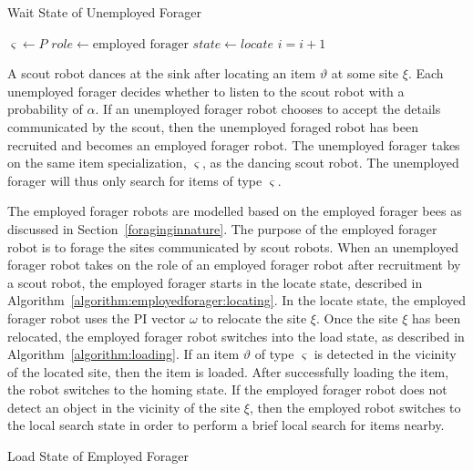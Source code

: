 \documentclass[preprint,12pt]{elsarticle}
\begin{document}
\begin{algorithm}
\caption{Wait State of Unemployed Forager}
\label{algorithm:unemployedforager:locating}
\begin{algorithmic}[1]
	\State $\varsigma \gets P$
	\State {}
	\State $role \gets \text{employed forager}$
	\State $state \gets locate$
\EndIf
\State $i =i + 1$
\EndFunction
\end{algorithmic}
\end{algorithm}

A scout robot dances at the sink after locating an item $\vartheta$ at some site $\xi$. Each unemployed forager decides whether to listen to the scout robot with a probability of $\alpha$. If an unemployed forager robot chooses to accept the details communicated by the scout, then the unemployed foraged robot has been recruited and becomes an employed forager robot. The unemployed forager takes on the same item specialization, $\varsigma$, as the dancing scout robot. The unemployed forager will thus only search for items of type $\varsigma$. 

The employed forager robots are modelled based on the employed forager bees as discussed in Section~\ref{foraginginnature}. The purpose of the employed forager robot is to forage the sites communicated by scout robots. When an unemployed forager robot takes on the role of an employed forager robot after recruitment by a scout robot, the employed forager starts in the locate state, described in Algorithm~\ref{algorithm:employedforager:locating}. In the locate state, the employed forager robot uses the PI vector $\omega$ to relocate the site $\xi$. Once the site $\xi$ has been relocated, the employed forager robot switches into the load state, as described in Algorithm~\ref{algorithm:loading}. If an item $\vartheta$ of type $\varsigma$ is detected in the vicinity of the located site, then the item is loaded. After successfully loading the item, the robot switches to the homing state. If the employed forager robot does not detect an object in the vicinity of the site $\xi$, then the employed robot switches to the local search state in order to perform a brief local search for items nearby. 

\begin{algorithm}
\caption{Load State of Employed Forager}
\label{algorithm:loading}
\begin{algorithmic}[1]
	\State {}
\Else
\EndIf
\EndFunction
\end{algorithmic}
\end{algorithm}
\end{document}
